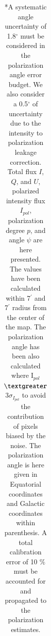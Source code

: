 \documentclass[twocolumn,traditabstract]{aa}
\begin{document}
\begin{table}
\begin{tabular}{ccccccccc}
    \hline            
    \hline   
    \end{tabular}
   \caption{ 
   	*A systematic angle uncertainty of 1.8$^{\circ}$ must be considered in the polarization angle error budget. We also consider a 0.5$^{\circ}$ of uncertainty due to the intensity to polarization leakage correction.
   	 Total flux $I$, $Q$, and $U$, polarized intensity flux $I_{pol}$, polarization degree $p$, and angle $\psi$ are here presented. The values have been calculated within 7$^{\prime}$ and 7$^{\prime}$ radius from the center of the map. The polarization angle has been also calculated where I$_{pol}$ $\textgreater$ 3$\sigma_{I_{pol}}$ to avoid the contribution of pixels biased by the noise.
     The polarization angle is here given in Equatorial coordinates and Galactic coordinates within parenthesis. 
     A total calibration error of 10 $\%$ must be accounted for and propagated to the
     polarization estimates.
    }
    \label{tab:crab_results}
 \end{table}
 
\end{document}
